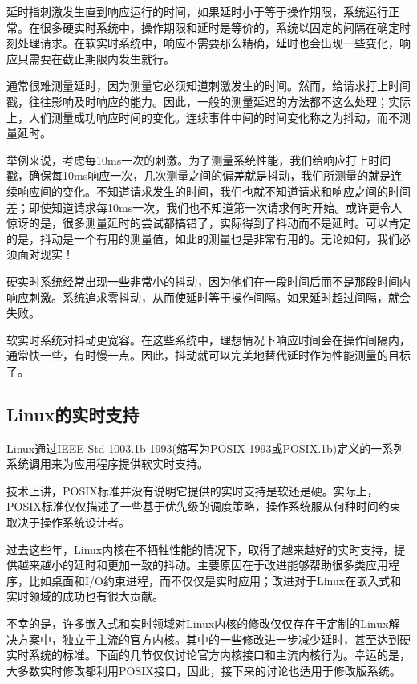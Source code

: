   延时指刺激发生直到响应运行的时间，如果延时小于等于操作期限，系统运行正常。在很多硬实时系统中，操作期限和延时是等价的，系统以固定的间隔在确定时刻处理请求。在软实时系统中，响应不需要那么精确，延时也会出现一些变化，响应只需要在截止期限内发生就行。

  通常很难测量延时，因为测量它必须知道刺激发生的时间。然而，给请求打上时间戳，往往影响及时响应的能力。因此，一般的测量延迟的方法都不这么处理；实际上，人们测量成功响应时间的变化。连续事件中间的时间变化称之为抖动，而不测量延时。

  举例来说，考虑每10ms一次的刺激。为了测量系统性能，我们给响应打上时间戳，确保每10ms响应一次，几次测量之间的偏差就是抖动，我们所测量的就是连续响应间的变化。不知道请求发生的时间，我们也就不知道请求和响应之间的时间差；即使知道请求每10ms一次，我们也不知道第一次请求何时开始。或许更令人惊讶的是，很多测量延时的尝试都搞错了，实际得到了抖动而不是延时。可以肯定的是，抖动是一个有用的测量值，如此的测量也是非常有用的。无论如何，我们必须面对现实！

  硬实时系统经常出现一些非常小的抖动，因为他们在一段时间后而不是那段时间内响应刺激。系统追求零抖动，从而使延时等于操作间隔。如果延时超过间隔，就会失败。

  软实时系统对抖动更宽容。在这些系统中，理想情况下响应时间会在操作间隔内，通常快一些，有时慢一点。因此，抖动就可以完美地替代延时作为性能测量的目标了。

\subsection{Linux的实时支持}

  Linux通过IEEE Std 1003.1b-1993(缩写为POSIX 1993或POSIX.1b)定义的一系列系统调用来为应用程序提供软实时支持。

  技术上讲，POSIX标准并没有说明它提供的实时支持是软还是硬。实际上，POSIX标准仅仅描述了一些基于优先级的调度策略，操作系统服从何种时间约束取决于操作系统设计者。

  过去这些年，Linux内核在不牺牲性能的情况下，取得了越来越好的实时支持，提供越来越小的延时和更加一致的抖动。主要原因在于改进能够帮助很多类应用程序，比如桌面和I/O约束进程，而不仅仅是实时应用；改进对于Linux在嵌入式和实时领域的成功也有很大贡献。

  不幸的是，许多嵌入式和实时领域对Linux内核的修改仅仅存在于定制的Linux解决方案中，独立于主流的官方内核。其中的一些修改进一步减少延时，甚至达到硬实时系统的标准。下面的几节仅仅讨论官方内核接口和主流内核行为。幸运的是，大多数实时修改都利用POSIX接口，因此，接下来的讨论也适用于修改版系统。

